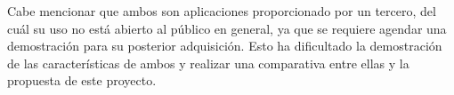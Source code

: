 Cabe mencionar que ambos son aplicaciones proporcionado por un tercero, del cuál su uso no está abierto al público en general, ya que se requiere agendar una demostración para su posterior adquisición. Esto ha dificultado la demostración de las características de ambos y realizar una comparativa entre ellas y la propuesta de este proyecto.




    

    
